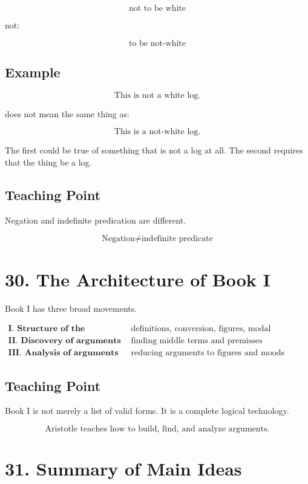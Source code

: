 \documentclass[12pt]{article}
\begin{document}
\[
\text{not to be white}
\]

not:

\[
\text{to be not-white}
\]

\subsection*{Example}

\[
\text{This is not a white log.}
\]

does not mean the same thing as:

\[
\text{This is a not-white log.}
\]

The first could be true of something that is not a log at all. The second
requires that the thing be a log.

\subsection*{Teaching Point}

Negation and indefinite predication are different.

\[
\boxed{
\text{Negation} \neq \text{indefinite predicate}
}
\]

\section*{30. The Architecture of Book I}

Book I has three broad movements.

\[
\begin{array}{ll}
\textbf{I. Structure of the syllogism} &
\text{definitions, conversion, figures, modal syllogisms} \\
\textbf{II. Discovery of arguments} &
\text{finding middle terms and premisses} \\
\textbf{III. Analysis of arguments} &
\text{reducing arguments to figures and moods}
\end{array}
\]

\subsection*{Teaching Point}

Book I is not merely a list of valid forms. It is a complete logical technology.

\[
\boxed{
\text{Aristotle teaches how to build, find, and analyze arguments.}
}
\]

\section*{31. Summary of Main Ideas}
\end{document}
